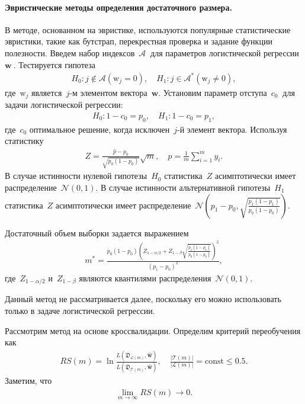 \paragraph{Эвристические методы определения достаточного размера.}
В методе, основанном на эвристике, используются популярные статистические эвристики, такие как бутстрап, перекрестная проверка и задание функции полезности.
Введем набор индексов~$\mathcal {A}~$ для параметров логистической регрессии~$\textbf {w}~$. Тестируется гипотеза
\[
\label{eq:hb:1}
\begin{aligned}
	H_0: j \not\in\mathcal{A} \left(\text{w}_{j} = 0\right), \quad H_1: j \in \mathcal{A}^* \left(\text{w}_{j} \not= 0\right),
\end{aligned}
\]
где~$\text{w}_{j}$ является~$j$-м элементом вектора~$\textbf{w}$.
Установим параметр отступа~$ c_0~$ для задачи логистической регрессии:
\[
\label{eq:hb:2}
\begin{aligned}
	H_0: 1-c_0 = p_0, \quad H_1: 1-c_0 = p_1,
\end{aligned}
\]
где~$c_0$ оптимальное решение, когда исключен~$j$-й элемент вектора.
Используя статистику
\[
\label{eq:hb:3}
\begin{aligned}
	Z = \frac{\hat{p}-p_0}{\sqrt{p_0(1-p_0)}}\sqrt{m}, \quad \hat{p} = \frac{1}{m}\sum_{i=1}^{m}y_i.
\end{aligned}
\]
В случае истинности нулевой гипотезы~$H_0$ статистика~$Z$ асимптотически имеет распределение~$\mathcal{N}\left(0, 1\right)$. В случае истинности альтернативной гипотезы~$H_1$ статистика~$Z$  асимптотически имеет распределение~$ \mathcal{N}\left(p_1-p_0, \sqrt{\frac{p_1(1-p_1)}{p_0(1-p_0)}}\right)$.
      
Достаточный объем выборки задается выражением
\[
\label{eq:hb:4}
\begin{aligned}
	m^* = \frac{p_0(1-p_0)\left(Z_{1-\alpha/2} + Z_{1-\beta}\sqrt{\frac{p_1(1-p_1)}{p_0(1-p_0)}}\right)^2}{(p_1-p_0)^2},
\end{aligned}
\]
где~$Z_{1-\alpha/2}$ и~$Z_{1-\beta}$ являются квантилями распределения~$\mathcal{N}\left(0, 1\right)$.
    
Данный метод не рассматривается далее, поскольку его можно использовать только в задаче логистической регрессии.

Рассмотрим метод на основе кроссвалидации. Определим критерий переобучения как
\[
\label{eq:hb:5}
\begin{aligned}
	RS(m) = \ln\frac{L(\mathfrak{D}_{\mathcal{L}(m)}, \hat{\textbf{w}})}{L(\mathfrak{D}_{\mathcal{T}(m)}, \hat{\textbf{w}})}, \quad \frac{|\mathcal{T}(m)|}{|\mathcal{L}(m)|} = \text{const} \leq 0.5.
\end{aligned}
\]
Заметим, что
\[
\label{eq:hb:6}
\begin{aligned}
	\lim_{m\to \infty}RS(m) \to 0.
\end{aligned}
\]

